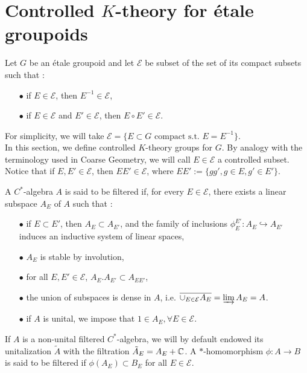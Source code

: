 \section{Controlled $K$-theory for étale groupoids}

Let $G$ be an étale groupoid and let $\mathcal E$ be  subset of the set of its compact subsets such that :
\begin{itemize}
\item[$\bullet$] if $E\in \mathcal E$, then $E^{-1}\in\mathcal E$,
\item[$\bullet$] if $E\in \mathcal E$ and $E'\in \mathcal E$, then $E\circ E'\in\mathcal E$.
\end{itemize}

For simplicity, we will take $\mathcal E = \{E\subset G \text{ compact s.t. } E=E^{-1}\}$.\\

In this section, we define controlled $K$-theory groups for $G$. By analogy with the terminology used in Coarse Geometry, we will call $E\in \mathcal{E}$ a controlled subset. Notice that if $E,E'\in \mathcal E$, then $E E'\in\mathcal E$, where $EE' := \{ gg' , g\in E,g'\in E'\}$.\\

\begin{definition}
A $C^*$-algebra $A$ is said to be filtered if, for every $E\in \mathcal E$, there exists a linear subspace $A_E$ of $A$ such that :\\
\begin{itemize}
\item[$\bullet$] if $E \subset E'$, then $A_E\subset A_{E'}$, and the family of inclusions $\phi_E^{E'}: A_E\hookrightarrow A_{E'}$ induces an inductive system of linear spaces,
\item[$\bullet$] $A_E$ is stable by involution,
\item[$\bullet$] for all $E,E'\in\mathcal E$, $A_E.A_{E'}\subset A_{EE'}$,
\item[$\bullet$] the union of subspaces is dense in $A$, i.e. $\overline{\cup_{E\in\mathcal E}A_E} = \varinjlim A_E = A$.
\item[$\bullet$] if $A$ is unital, we impose that $1\in A_E,\forall E\in\mathcal E$.\\
\end{itemize}
\end{definition}

If $A$ is a non-unital filtered $C^*$-algebra, we will by default endowed its unitalization $\tilde A$ with the filtration $\tilde A_E = A_E + \mathbb C$. A $*$-homomorphism $\phi : A \rightarrow B$ is said to be filtered if $\phi(A_E)\subset B_E$ for all $E\in\mathcal E$.\\

